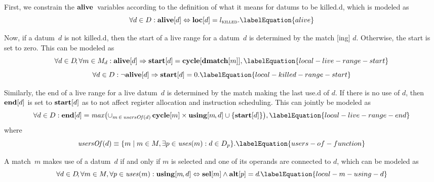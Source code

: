 First, we constrain the $\mVar{alive}$~\glspl{variable} according to the
definition of what it means for \glspl{datum} to be \gls{killed.d}, which is
modeled as
%
\begin{equation}
  \forall d \in \mDataSet :
  \mVar{alive}[d]
  \mEq
  \mVar{loc}[d] = \mKilledLocation.
  \labelEquation{alive}
\end{equation}

Now, if a \gls{datum}~$d$ is not \gls{killed.d}, then the start of a \gls{live
  range} for a \gls{datum}~$d$ is determined by the \gls{match}
[ing] $d$\hspace{-1pt}.
%
Otherwise, the start is set to zero.
%
This can be modeled as
%
\begin{equation}
  \forall d \in \mDataSet \!,
  \forall m \in \mMatchSet[d] :
  \mVar{alive}[d]
  \mImp
  \mVar{start}[d] = \mVar{cycle}[\mVar{dmatch}[m]],
  \labelEquation{local-live-range-start}
\end{equation}
%
\begin{equation}
  \forall d \in \mDataSet :
  \neg\mVar{alive}[d]
  \mImp
  \mVar{start}[d] = 0.
  \labelEquation{local-killed-range-start}
\end{equation}

Similarly, the end of a \gls{live range} for a live \gls{datum}~$d$ is
determined by the \gls{match} making the last \gls{use.d} of $d$\hspace{-1pt}.
%
If there is no use of $d$, then $\mVar{end}[d]$ is set to $\mVar{start}[d]$ as
to not affect \gls{register allocation} and \gls{instruction scheduling}.
%
This can jointly be modeled as
%
\begin{equation}
  \forall d \in \mDataSet :
  \mVar{end}[d] =
  \mMax\!
  \left(
    \cup_{m \,\in\, \mUsersOf(d)} \,
    \mVar{cycle}[m]
    \times
    \mVar{using}[m \hspace{-1pt}, d]
    \cup
    \mSet{\mVar{start}[d]}
  \right)\!,
  \labelEquation{local-live-range-end}
\end{equation}
%
where
%
\begin{equation}
  \mUsersOf(d)
  \equiv
  \mSetBuilder{m}%
              {
                m \in \mMatchSet,
                \exists p \in \mUses(m) :
                d \in \mDataSet[p]
              }.
  \labelEquation{users-of-function}
\end{equation}

A \gls{match}~$m$ makes use of a \gls{datum}~$d$ if and only if $m$ is selected
and one of its \glspl{operand} are connected to $d$\hspace{-1pt}, which can be
modeled as
%
\begin{equation}
  \forall d \in \mDataSet \!,
  \forall m \in \mMatchSet,
  \forall p \in \mUses(m) :
  \mVar{using}[m \hspace{-1pt}, d]
  \mEq
  \mVar{sel}[m] \mAnd \mVar{alt}[p] = d \hspace{-1pt}.
  \labelEquation{local-m-using-d}
\end{equation}

